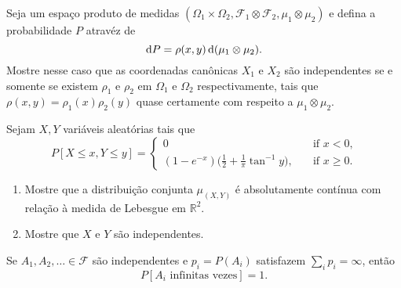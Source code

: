 \begin{exercise}
  Seja um espaço produto de medidas $(\Omega_1 \times \Omega_2, \mathcal{F}_1 \otimes \mathcal{F}_2, \mu_1 \otimes \mu_2)$ e defina a probabilidade $P$ atravéz de
  \begin{equation}
    \mathop{}\!\mathrm{d} P = \rho(x,y) \mathop{}\!\mathrm{d} (\mu_1 \otimes \mu_2).
  \end{equation}
  Mostre nesse caso que as coordenadas canônicas $X_1$ e $X_2$ são independentes se e somente se existem $\rho_1$ e $\rho_2$ em $\Omega_1$ e $\Omega_2$ respectivamente, tais que $\rho(x,y) = \rho_1(x) \rho_2(y)$ quase certamente com respeito a $\mu_1 \otimes \mu_2$.
\end{exercise}

\begin{exercise}
  Sejam $X, Y$ vari\'aveis aleat\'orias tais que
  \begin{equation}
    P[X \leq x, Y \leq y] =
    \begin{cases}
      0 & \quad \text{if $x < 0$,}\\
      (1-e^{-x}) \Big(\frac 12 + \frac 1\pi \tan^{-1} y \Big), & \quad \text{if $x \geq 0$}.
    \end{cases}
  \end{equation}
  \begin{enumerate}[\quad a)]
  \item Mostre que a distribui\c{c}\~ao conjunta $\mu_{(X,Y)}$ \'e
    absolutamente cont\'inua com rela\c{c}\~ao \`a medida de Lebesgue em
    $\mathbb{R}^2$.
  \item Mostre que $X$ e $Y$ s\~ao independentes.
  \end{enumerate}
\end{exercise}


\begin{lemma}
  Se $A_1, A_2, \dots \in \mathcal{F}$ são independentes e $p_i = P(A_i)$ satisfazem $\sum_i p_i = \infty$, então
  \begin{equation}
    P[A_i \text{ infinitas vezes}] = 1.
  \end{equation}
\end{lemma}

